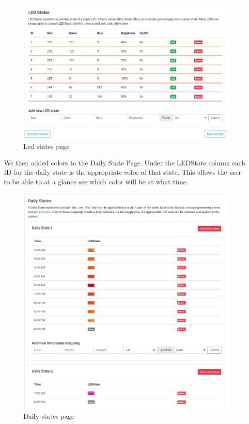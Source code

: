 \documentclass[onecolumn, draftclsnofoot,10pt, compsoc]{IEEEtran}
\begin{document}
		\begin{center}
			\begin{figure}[H]
				\includegraphics[width=\linewidth]{site/led_states.png}
				\caption{Led states page}
				\label{fig:siteLEDStates}
			\end{figure}
		\end{center}

		\noindent We then added colors to the Daily State Page. Under the LEDState column each ID for the daily state is the appropriate color of that state. This allows the user to be able to at a glance see which color will be at what time.


		\begin{center}
			\begin{figure}[H]
				\includegraphics[width=\linewidth]{site/daily_states.png}
				\caption{Daily states page}
				\label{fig:siteDailyStates}
			\end{figure}
		\end{center}
\end{document}
